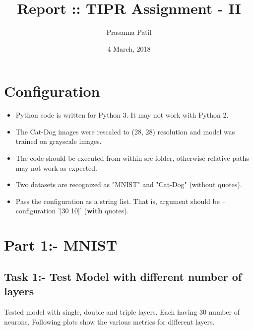 \documentclass{article}
\title{Report :: TIPR Assignment - II}
\author{Prasanna Patil}
\date{4 March, 2018}
\begin{document}
\maketitle
\section{Configuration}
\begin{itemize}
	\item Python code is written for Python 3. It may not work with Python 2.
	\item The Cat-Dog images were rescaled to (28, 28) resolution and model was trained on grayscale images.
	\item The code should be executed from within src folder, otherwise relative paths may not work as expected.
	\item Two datasets are recognized as "MNIST" and "Cat-Dog" (without quotes).
	\item Pass the configuration as a string list. That is, argument should be --configuration '[30 10]' (\textbf{with} quotes).
\end{itemize}

\section{Part 1:- MNIST}
\subsection{Task 1:- Test Model with different number of layers}
Tested model with single, double and triple layers. Each having 30 number of neurons. Following plots show the various metrics for different layers.
\end{document}

